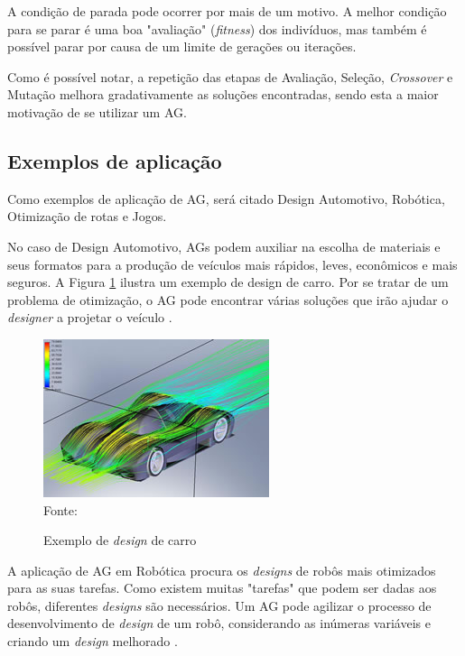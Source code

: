 \documentclass[
	12pt,					%
	openright,				%
	oneside,				%
	a4paper,				%
	bibjustif,				%
	chapter=TITLE,			%
	english,				%
	brazil,					%
	]{abntex2}
\newcommand{\source}[1]{\small Fonte: {#1}}
\begin{document}
	A condição de parada pode ocorrer por mais de um motivo.
	A melhor condição para se parar é uma boa "avaliação"{} (\textit{fitness}) dos indivíduos,
	mas também é possível parar por causa de um limite de gerações ou iterações.
	
	Como é possível notar,
	a repetição das etapas de Avaliação, Seleção, \textit{Crossover} e Mutação melhora gradativamente as soluções encontradas,
	sendo esta a maior motivação de se utilizar um AG.	
	
	\FloatBarrier
	\subsection{Exemplos de aplicação}
	Como exemplos de aplicação de AG,
	será citado
	Design Automotivo, Robótica, Otimização de rotas e Jogos.
	
	No caso de Design Automotivo,
	AGs podem auxiliar na escolha de materiais e seus formatos para a produção de veículos mais rápidos, leves, econômicos e mais seguros.
	A Figura \ref{fig:automotiveDesign} ilustra um exemplo de design de carro.
	Por se tratar de um problema de otimização,
	o AG pode encontrar várias soluções que irão ajudar o \textit{designer} a projetar o veículo
	\cite{brainz}.
	
	\begin{figure}[ht!]
		\centering
		\caption{Exemplo de \textit{design} de carro}
		\includegraphics[scale=0.7]{img/AutomotiveDesign.jpg}\\
		\vspace{0.5mm}
		\source{}
		\label{fig:automotiveDesign}
	\end{figure}
	
	A aplicação de AG em Robótica procura os \textit{designs} de robôs mais otimizados para as suas tarefas.
	Como existem muitas "tarefas"{} que podem ser dadas aos robôs,
	diferentes \textit{designs} são necessários.
	Um AG pode agilizar o processo de desenvolvimento de \textit{design} de um robô,
	considerando as inúmeras variáveis e criando um \textit{design} melhorado
	\cite{brainz}.
	
\end{document}
